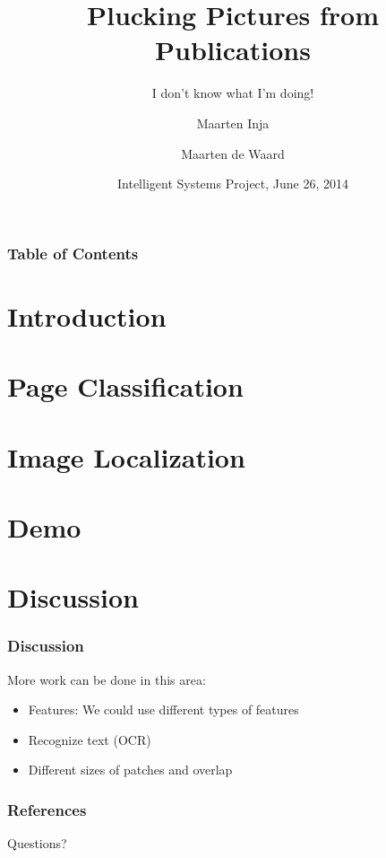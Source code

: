 \documentclass{beamer}
\title{Plucking Pictures from Publications}
\subtitle{I don't know what I'm doing!}
\author{Maarten Inja \and Maarten de Waard}
\institute[UvA]{University of Amsterdam}
\date[2014]{Intelligent Systems Project, June 26, 2014}
\newcommand{\slide}[2]
{
\begin{frame}
\frametitle{#1} 

#2

\end{frame}
}
\begin{document}
\begin{frame}
\titlepage
\end{frame}

\slide{Table of Contents}
{
	\tableofcontents
}

\section{Introduction}


\section{Page Classification}


\section{Image Localization}




\section{Demo}


\section{Discussion}

\slide{Discussion}
{
	More work can be done in this area:
	\begin{itemize}
		\item Features: We could use different types of features 
		\item Recognize text (OCR)
		\item Different sizes of patches and overlap
	\end{itemize}
}
\begin{frame}[allowframebreaks]
        \frametitle{References}
        
        
\end{frame}

\begin{frame}
Questions?
\end{frame}
\end{document}
